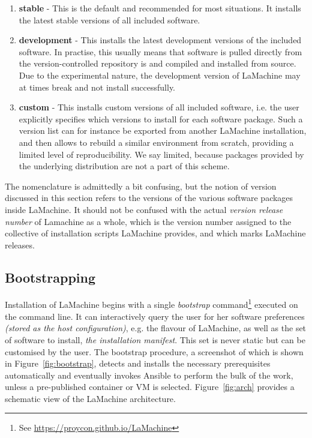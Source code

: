 \documentclass[a4paper,11pt]{article}
\begin{document}
\begin{enumerate}
    \item \textbf{stable} - This is the default and recommended for most situations. It installs the latest stable
        versions of all included software.
    \item \textbf{development} - This installs the latest development versions of the included software. In practise,
        this usually means that software is pulled directly from the version-controlled repository is and compiled and installed from source. Due to the experimental nature, the development version of
        LaMachine may at times break and not install successfully.
    \item \textbf{custom} - This installs custom versions of all included software, i.e. the user explicitly
        specifies which versions to install for each software package.  Such a version list can for instance be exported
        from another LaMachine installation, and then allows to rebuild a similar environment from scratch, providing a
        limited level of reproducibility. We say limited, because packages
        provided by the underlying distribution are not a part of this scheme.
\end{enumerate}

The nomenclature is admittedly a bit confusing, but the notion of version discussed in this section refers to the
versions of the various software packages inside LaMachine. It should not be
confused with the actual \emph{version release number} of Lamachine as a whole, which is the version number assigned to
the collective of installation scripts LaMachine provides, and which marks LaMachine releases.

\subsection{Bootstrapping}

Installation of LaMachine begins with a single \emph{bootstrap} command\footnote{See \url{https://proycon.github.io/LaMachine}}
executed on the command line.  It can interactively query the user for her software preferences \emph{(stored as the
host configuration)}, e.g. the flavour of LaMachine, as well as the set of software to install, \emph{the installation
manifest}. This set is never static but can be customised by the user. The bootstrap procedure, a screenshot of which is shown in
Figure~\ref{fig:bootstrap}, detects and installs the
necessary prerequisites automatically and eventually invokes Ansible to perform the bulk of the work, unless a
pre-published container or VM is selected.  Figure~\ref{fig:arch} provides a schematic view of the LaMachine
architecture.
\end{document}

